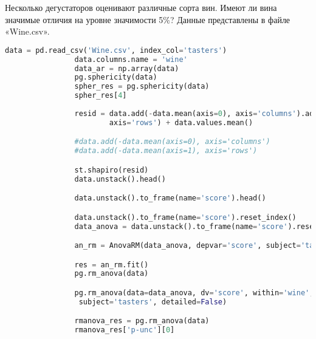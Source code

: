 		\begin{problem}
			Несколько дегустаторов оценивают различные сорта вин. Имеют ли вина значимые отличия на уровне значимости 5$\%$? Данные представлены в файле «Wine.csv».
		\end{problem}
		\begin{solution}
			\begin{lstlisting}[language=Python]
				data = pd.read_csv('Wine.csv', index_col='tasters') 
				data.columns.name = 'wine'
				data_ar = np.array(data)
				pg.sphericity(data) 
				spher_res = pg.sphericity(data)
				spher_res[4]
				
				resid = data.add(-data.mean(axis=0), axis='columns').add(-data.mean(axis=1), 
						axis='rows') + data.values.mean()

				#data.add(-data.mean(axis=0), axis='columns')
				#data.add(-data.mean(axis=1), axis='rows')

				st.shapiro(resid)
				data.unstack().head()

				data.unstack().to_frame(name='score').head() 

				data.unstack().to_frame(name='score').reset_index()
				data_anova = data.unstack().to_frame(name='score').reset_index()

				an_rm = AnovaRM(data_anova, depvar='score', subject='tasters', within=['wine'])

				res = an_rm.fit()
				pg.rm_anova(data)

				pg.rm_anova(data=data_anova, dv='score', within='wine',
				 subject='tasters', detailed=False)

				rmanova_res = pg.rm_anova(data)
				rmanova_res['p-unc'][0]
			\end{lstlisting}
		\end{solution}















